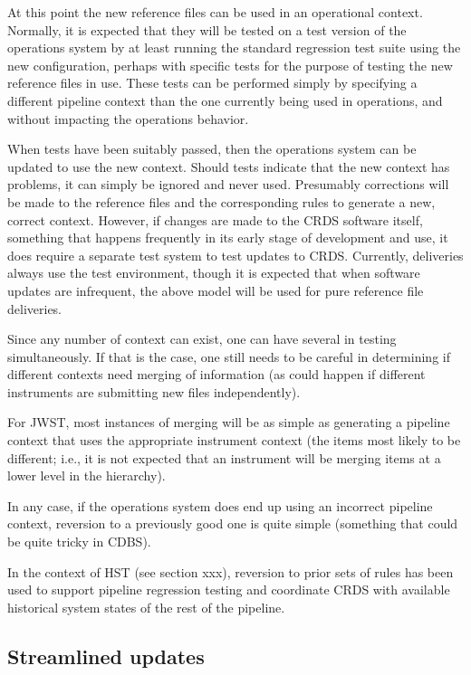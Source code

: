 \documentclass[final,authoryear,5p,times,twocolumn]{elsarticle}
\begin{document}
At this point the new reference files can be used in an operational
context. Normally, it is expected that they will be tested on a test version of
the operations system by at least running the standard regression test suite
using the new configuration, perhaps with specific tests for the purpose of
testing the new reference files in use. These tests can be performed simply by
specifying a different pipeline context than the one currently being used in
operations, and without impacting the operations behavior.

When tests have been suitably passed, then the operations system can be updated
to use the new context. Should tests indicate that the new context has
problems, it can simply be ignored and never used. Presumably corrections will
be made to the reference files and the corresponding rules to generate a new,
correct context. However, if changes are made to the CRDS software itself,
something that happens frequently in its early stage of development and use,
it does require a separate test system to test updates to CRDS. Currently, 
deliveries always use the test environment, though it is expected that when
software updates are infrequent, the above model will be used for pure
reference file deliveries.

Since any number of context can exist, one can have several in testing
simultaneously. If that is the case, one still needs to be careful in
determining if different contexts need merging of information (as could happen
if different instruments are submitting new files independently).

For JWST, most instances of merging will be as simple as generating a
pipeline context that uses the appropriate instrument context (the items
most likely to be different; i.e., it is not expected that an instrument 
will be merging items at a lower level in the hierarchy).

In any case, if the operations system does end up using an incorrect pipeline
context, reversion to a previously good one is quite simple (something that
could be quite tricky in CDBS).

In the context of HST (see section xxx), reversion to prior sets of 
rules has been used to
support pipeline regression testing and coordinate CRDS with available
historical system states of the rest of the pipeline.

\subsection{Streamlined updates}
\end{document}
